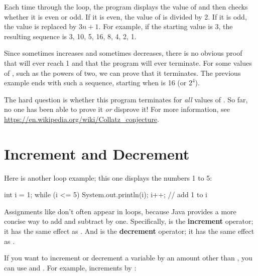 Each time through the loop, the program displays the value of  and then checks whether it is even or odd.
If it is even, the value of  is divided by 2.
If it is odd, the value is replaced by $3n+1$.
For example, if the starting value is 3, the resulting sequence is 3, 10, 5, 16, 8, 4, 2, 1.

Since  sometimes increases and sometimes decreases, there is no obvious proof that  will ever reach 1 and that the program will ever terminate.
For some values of , such as the powers of two, we can prove that it terminates.
The previous example ends with such a sequence, starting when  is 16 (or $2^4$).

The hard question is whether this program terminates for {\em all} values of .
So far, no one has been able to prove it {\em or} disprove it!
For more information, see \url{https://en.wikipedia.org/wiki/Collatz_conjecture}.


\section{Increment and Decrement}

Here is another  loop example; this one displays the numbers 1 to 5:

\begin{code}
int i = 1;
while (i <= 5) {
    System.out.println(i);
    i++;  // add 1 to i
}
\end{code}


Assignments like  don't often appear in loops, because Java provides a more concise way to add and subtract by one.
Specifically, \java{++} is the {\bf increment} operator; it has the same effect as .
And \java{--} is the {\bf decrement} operator; it has the same effect as .


If you want to increment or decrement a variable by an amount other than , you can use \java{+=} and \java{-=}.
For example,  increments  by :


